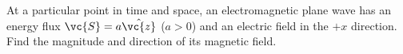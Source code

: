 At a particular point in time and space, 
an electromagnetic plane wave has an energy flux $\vc{S}=a\hat{\vc{z}}$ ($a>0$)
and an electric field in the $+x$ direction.
Find the magnitude and direction of its magnetic field.\answercheck
